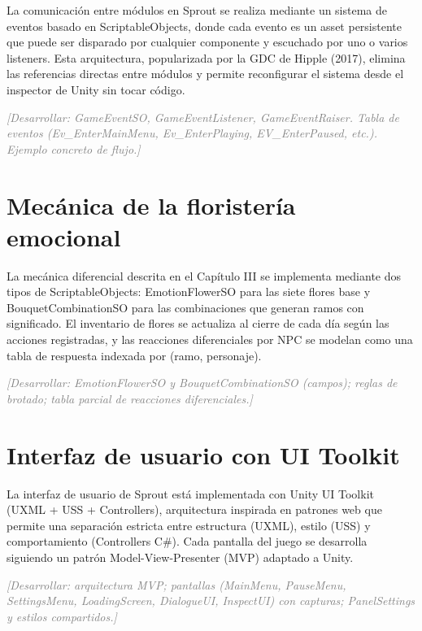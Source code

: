 \documentclass[12pt,twoside,titlepage]{report}
\begin{document}
La comunicación entre módulos en Sprout se realiza mediante un sistema de eventos basado en ScriptableObjects, donde cada evento es un asset persistente que puede ser disparado por cualquier componente y escuchado por uno o varios listeners. Esta arquitectura, popularizada por la GDC de Hipple (2017), elimina las referencias directas entre módulos y permite reconfigurar el sistema desde el inspector de Unity sin tocar código.

\textcolor{gray}{\textit{[Desarrollar: GameEventSO, GameEventListener, GameEventRaiser. Tabla de eventos (Ev\_EnterMainMenu, Ev\_EnterPlaying, EV\_EnterPaused, etc.). Ejemplo concreto de flujo.]}}

\section{Mecánica de la floristería emocional}

La mecánica diferencial descrita en el Capítulo III se implementa mediante dos tipos de ScriptableObjects: EmotionFlowerSO para las siete flores base y BouquetCombinationSO para las combinaciones que generan ramos con significado. El inventario de flores se actualiza al cierre de cada día según las acciones registradas, y las reacciones diferenciales por NPC se modelan como una tabla de respuesta indexada por (ramo, personaje).

\textcolor{gray}{\textit{[Desarrollar: EmotionFlowerSO y BouquetCombinationSO (campos); reglas de brotado; tabla parcial de reacciones diferenciales.]}}

\section{Interfaz de usuario con UI Toolkit}

La interfaz de usuario de Sprout está implementada con Unity UI Toolkit (UXML + USS + Controllers), arquitectura inspirada en patrones web que permite una separación estricta entre estructura (UXML), estilo (USS) y comportamiento (Controllers C\#). Cada pantalla del juego se desarrolla siguiendo un patrón Model-View-Presenter (MVP) adaptado a Unity.

\textcolor{gray}{\textit{[Desarrollar: arquitectura MVP; pantallas (MainMenu, PauseMenu, SettingsMenu, LoadingScreen, DialogueUI, InspectUI) con capturas; PanelSettings y estilos compartidos.]}}
\end{document}
